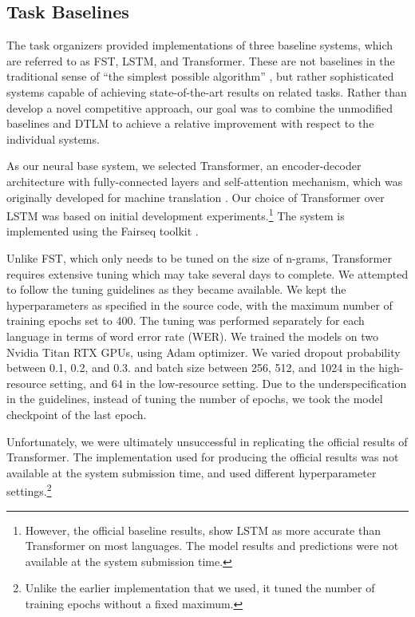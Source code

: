 \documentclass[11pt,a4paper]{article}
\newcommand{\transformer}{{\sc Transformer}}
\begin{document}
\subsection{Task Baselines} 

The task organizers provided implementations of three baseline systems,
which are referred to as FST, LSTM, and {\transformer}.
These are not baselines in the traditional sense
of ``the simplest possible algorithm'' \cite[page 234]{manning01},
but rather sophisticated systems 
capable of achieving state-of-the-art results on related tasks.
Rather than develop a novel competitive approach,
our goal was to combine the unmodified baselines and DTLM to achieve 
a relative improvement with respect to the individual systems.






As our neural base system, we selected {\transformer},
an encoder-decoder architecture with fully-connected layers 
and self-attention mechanism,
which was originally developed for machine translation \cite{vaswani2017}. 
Our choice of {\transformer} over LSTM was based on initial
development experiments.\footnote{However, the official baseline results,
show LSTM as more accurate than {\transformer} on most languages. 
The model results and predictions were not available at the 
system submission time.}
The system is implemented using the Fairseq toolkit \cite{ott2019}.

Unlike FST, 
which only needs to be tuned on the size of n-grams, %
{\transformer} requires extensive tuning
which may take several days to complete.
We attempted to follow the tuning guidelines
as they became available.
We kept the hyperparameters as specified in the source code,
with the maximum number of training epochs set to 400. 
The tuning was performed separately for each language 
in terms of word error rate (WER). 
We trained the models on two Nvidia Titan RTX GPUs,
using Adam optimizer. %
We varied dropout probability between 0.1, 0.2, and 0.3.
and batch size between 256, 512, and 1024 in the high-resource setting, 
and 64 in the low-resource setting.
Due to the underspecification in the guidelines,
instead of tuning the number of epochs, %
we took the model checkpoint of the last epoch.

Unfortunately, 
we were ultimately unsuccessful in replicating the official results
of {\transformer}.
The implementation used for 
producing the official results was not available 
at the system submission time, 
and used different hyperparameter settings.\footnote{Unlike
the earlier implementation that we used, 
it tuned the number of training epochs without a fixed maximum.
} %
\end{document}
